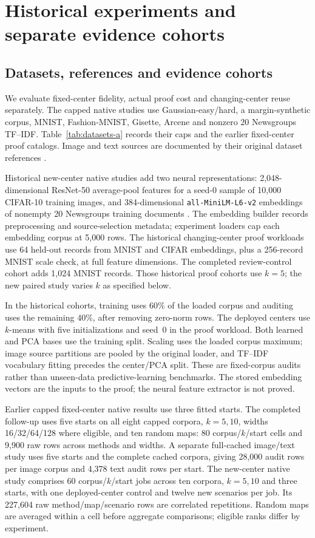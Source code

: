 \section{Historical experiments and separate evidence cohorts}\label{app:historical-experiments}
\subsection{Datasets, references and evidence cohorts}
We evaluate fixed-center fidelity, actual proof cost and changing-center reuse separately. The capped native studies use Gaussian-easy/hard, a margin-synthetic corpus, MNIST, Fashion-MNIST, Gisette, Arcene and nonzero 20 Newsgroups TF--IDF. Table~\ref{tab:datasets-a} records their caps and the earlier fixed-center proof catalogs. Image and text sources are documented by their original dataset references \cite{lecun1998,fashion2017,gisette2004,arcene2004,news20data}.


Historical new-center native studies add two neural representations: 2,048-dimensional ResNet-50 average-pool features for a seed-0 sample of 10,000 CIFAR-10 training images, and 384-dimensional \texttt{all-MiniLM-L6-v2} embeddings of nonempty 20 Newsgroups training documents \cite{krizhevsky2009cifar,he2016resnet,reimers2019sbert,minilmv2model}. The embedding builder records preprocessing and source-selection metadata; experiment loaders cap each embedding corpus at 5,000 rows. The historical changing-center proof workloads use 64 held-out records from MNIST and CIFAR embeddings, plus a 256-record MNIST scale check, at full feature dimensions. The completed review-control cohort adds 1,024 MNIST records. Those historical proof cohorts use $k=5$; the new paired study varies $k$ as specified below.

In the historical cohorts, training uses 60\% of the loaded corpus and auditing uses the remaining 40\%, after removing zero-norm rows. The deployed centers use $k$-means with five initializations and seed~0 in the proof workload. Both learned and PCA bases use the training split. Scaling uses the loaded corpus maximum; image source partitions are pooled by the original loader, and TF--IDF vocabulary fitting precedes the center/PCA split. These are fixed-corpus audits rather than unseen-data predictive-learning benchmarks. The stored embedding vectors are the inputs to the proof; the neural feature extractor is not proved.

Earlier capped fixed-center native results use three fitted starts. The completed follow-up uses five starts on all eight capped corpora, $k=5,10$, widths 16/32/64/128 where eligible, and ten random maps: 80 corpus/$k$/start cells and 9,900 raw rows across methods and widths. A separate full-cached image/text study uses five starts and the complete cached corpora, giving 28,000 audit rows per image corpus and 4,378 text audit rows per start. The new-center native study comprises 60 corpus/$k$/start jobs across ten corpora, $k=5,10$ and three starts, with one deployed-center control and twelve new scenarios per job. Its 227,604 raw method/map/scenario rows are correlated repetitions. Random maps are averaged within a cell before aggregate comparisons; eligible ranks differ by experiment.

